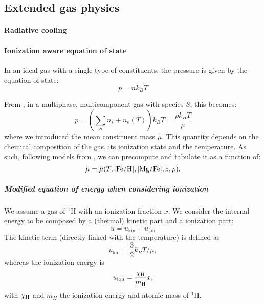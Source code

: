 \subsection{Extended gas physics}
\paragraph{Radiative cooling}

\paragraph{Ionization aware equation of state}
In an ideal gas with a single type of constituents, the pressure is given by the equation of state:
\begin{equation}
p = n k_B T
\end{equation}

From \citep[p. 161]{Vandenbroucke2016}, in a multiphase, multicomponent gas with species $S$, this becomes:
\begin{equation}
p = \left(\sum_S n_s + n_e(T)\right) k_BT =\frac{\rho k_B T}{\bar\mu}
\end{equation}
where we introduced the mean constituent mass $\bar\mu$.
This quantity depends on the chemical composition of the gas, its ionization state and the temperature.
As such, following models from \citet{DeRijcke2013}, we can precompute and tabulate it as a function of:
\[\bar\mu = \bar\mu(T, [\text{Fe}/\text{H}], [\text{Mg}/\text{Fe}], z, \rho).\]

\subparagraph{Modified equation of energy when considering ionization}
We assume a gas of ${}^1$H with an ionization fraction $x$.
We consider the internal energy to be composed by a (thermal) kinetic part and a ionization part:
\begin{equation}
\label{eq:u}
u = u_\text{kin} + u_\text{ion}
\end{equation}
The kinetic term (directly linked with the temperature) is defined as
\begin{equation}
u_\text{kin} = \frac 3 2 k_B T/ \mu, 
\end{equation}
whereas the ionization energy is
\begin{equation}
\label{eq:u_ion}
u_\text{ion} = \dfrac{\chi_\text H}{m_\text H} x,
\end{equation}
with $\chi_\text H$ and $m_H$ the ionization energy and atomic mass of ${}^1$H.

